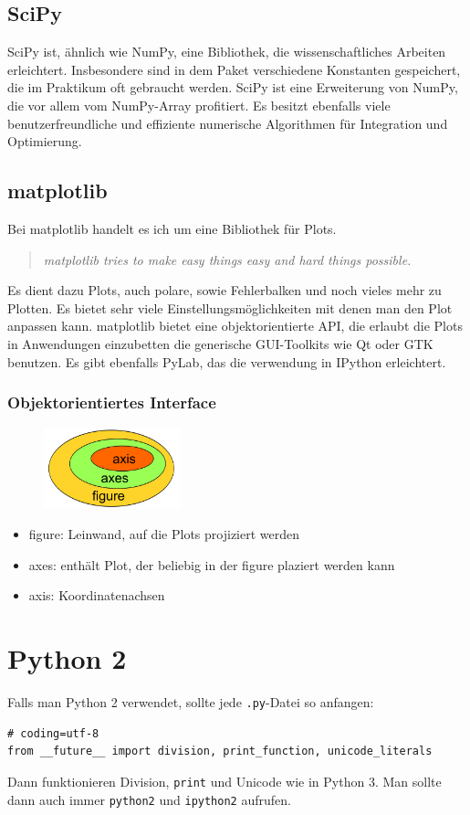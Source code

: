 \subsection{SciPy}
SciPy ist, ähnlich wie NumPy, eine Bibliothek, die wissenschaftliches Arbeiten erleichtert.
Insbesondere sind in dem Paket verschiedene Konstanten gespeichert, die im Praktikum oft gebraucht werden.
SciPy ist eine Erweiterung von NumPy, die vor allem vom NumPy-Array profitiert.
Es besitzt ebenfalls viele benutzerfreundliche und effiziente numerische Algorithmen für Integration und Optimierung.

\subsection{matplotlib}
Bei matplotlib handelt es ich um eine Bibliothek für Plots.
\begin{quote}
  \textit{matplotlib tries to make easy things easy and hard things possible.}
\end{quote}
Es dient dazu Plots, auch polare, sowie Fehlerbalken und noch vieles mehr zu Plotten.
Es bietet sehr viele Einstellungsmöglichkeiten mit denen man den Plot anpassen kann.
matplotlib bietet eine objektorientierte API, die erlaubt die Plots in Anwendungen einzubetten die generische GUI-Toolkits wie Qt oder GTK benutzen.
Es gibt ebenfalls PyLab, das die verwendung in IPython erleichtert.

\subsubsection{Objektorientiertes Interface}
\begin{figure}
  \includegraphics[width=150px]{img/matplotlib_v.png}
\end{figure}
\begin{itemize}
  \item figure: Leinwand, auf die Plots projiziert werden
  \item axes: enthält Plot, der beliebig in der figure plaziert werden kann
  \item axis: Koordinatenachsen 
\end{itemize}

\section{Python 2}
Falls man Python 2 verwendet, sollte jede \texttt{.py}-Datei so anfangen:
\begin{verbatim}
# coding=utf-8
from __future__ import division, print_function, unicode_literals
\end{verbatim}
Dann funktionieren Division, \texttt{print} und Unicode wie in Python 3.
Man sollte dann auch immer \texttt{python2} und \texttt{ipython2} aufrufen.

